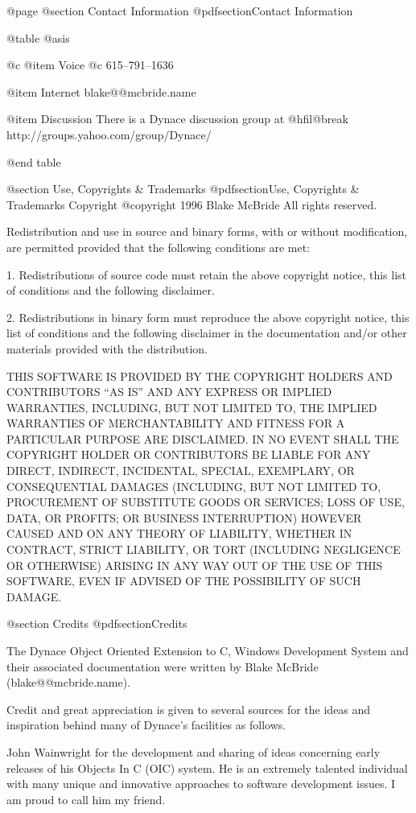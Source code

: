 @page
@section Contact Information
@pdfsection{Contact Information}

@table @asis

@c @item Voice
@c 615--791--1636

@item Internet
blake@@mcbride.name

@item Discussion
There is a Dynace discussion group at @hfil@break
http://groups.yahoo.com/group/Dynace/

@end table




@section Use, Copyrights & Trademarks
@pdfsection{Use, Copyrights & Trademarks}
Copyright  @copyright{} 1996 Blake McBride
All rights reserved.

Redistribution and use in source and binary forms, with or without
modification, are permitted provided that the following conditions are
met:

1. Redistributions of source code must retain the above copyright
notice, this list of conditions and the following disclaimer.

2. Redistributions in binary form must reproduce the above copyright
notice, this list of conditions and the following disclaimer in the
documentation and/or other materials provided with the distribution.

THIS SOFTWARE IS PROVIDED BY THE COPYRIGHT HOLDERS AND CONTRIBUTORS
``AS IS'' AND ANY EXPRESS OR IMPLIED WARRANTIES, INCLUDING, BUT NOT
LIMITED TO, THE IMPLIED WARRANTIES OF MERCHANTABILITY AND FITNESS FOR
A PARTICULAR PURPOSE ARE DISCLAIMED. IN NO EVENT SHALL THE COPYRIGHT
HOLDER OR CONTRIBUTORS BE LIABLE FOR ANY DIRECT, INDIRECT, INCIDENTAL,
SPECIAL, EXEMPLARY, OR CONSEQUENTIAL DAMAGES (INCLUDING, BUT NOT
LIMITED TO, PROCUREMENT OF SUBSTITUTE GOODS OR SERVICES; LOSS OF USE,
DATA, OR PROFITS; OR BUSINESS INTERRUPTION) HOWEVER CAUSED AND ON ANY
THEORY OF LIABILITY, WHETHER IN CONTRACT, STRICT LIABILITY, OR TORT
(INCLUDING NEGLIGENCE OR OTHERWISE) ARISING IN ANY WAY OUT OF THE USE
OF THIS SOFTWARE, EVEN IF ADVISED OF THE POSSIBILITY OF SUCH DAMAGE.

@section Credits
@pdfsection{Credits}


The Dynace Object Oriented Extension to C, Windows Development System
and their associated documentation were written by Blake McBride
(blake@@mcbride.name).

Credit and great appreciation is given to several sources for the
ideas and inspiration behind many of Dynace's facilities as follows.

John Wainwright for the development and sharing of ideas concerning
early releases of his Objects In C (OIC) system.  He is an extremely
talented individual with many unique and innovative approaches to
software development issues.  I am proud to call him my friend.

